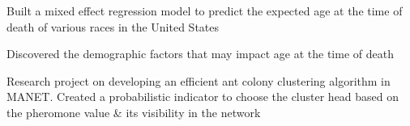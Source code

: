 \documentclass[]{resume-openfont}
\begin{document}
\begin{minipage}[t]{0.66\textwidth}
\descript{}\location{}
\begin{tightemize}
\item Built a mixed effect regression model to predict the expected age at the time of death of various races in the United States
\item Discovered the demographic factors that may impact age at the time of death
\end{tightemize}
\sectionsep

\descript{}\location{}
\begin{tightemize}
\item Research project on developing an efficient ant colony clustering algorithm in MANET. Created a probabilistic indicator to choose the cluster head based on the pheromone value \& its visibility in the network
\end{tightemize}
\sectionsep

\end{minipage} 
\end{document}
